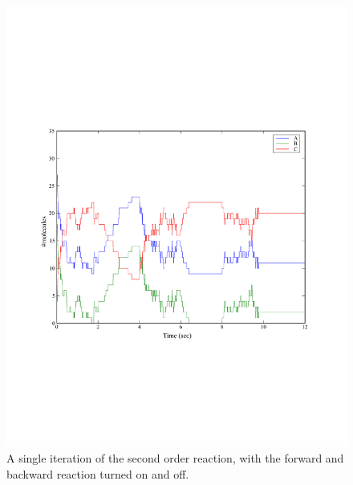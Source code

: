 \documentclass[a4paper,12pt]{book}
\begin{document}
\begin{figure}
\centering
\includegraphics[width=13cm]{chap02_secondorderreaction07.pdf}
\caption{A single iteration of the second order reaction, with the forward and backward reaction turned on and off.}
\label{fig:chap02:secondorderreaction07}
\end{figure}
\end{document}
